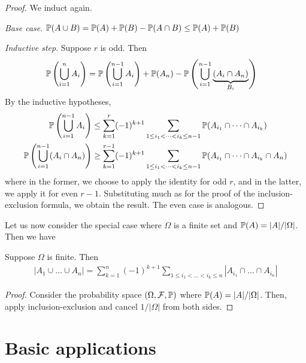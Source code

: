 \documentclass{../template/note}
\begin{document}
    \begin{proof}
        We induct again.

        \emph{Base case}. \(\mathbb P(A \cup B) = \mathbb P(A) + \mathbb P(B) - \mathbb P(A \cap B) \leq \mathbb P(A) + \mathbb P(B)\)

        \emph{Inductive step}. Suppose \(r\) is odd. Then
        \begin{align*}
            \mathbb P\left(\bigcup_{i=1}^n A_i\right) &= \mathbb P\left(\bigcup_{i=1}^{n-1} A_i\right) + \mathbb P(A_n) - \mathbb P\left(\bigcup_{i=1}^{n-1} \underbrace{\left(A_i \cap A_n\right)}_{B_i}\right)
        \end{align*}
        By the inductive hypotheses,
        \begin{align*}
            \mathbb P\left(\bigcup_{i=1}^{n-1} A_i\right) &\leq \sum_{k=1}^{r} (-1)^{k+1} \sum_{1 \leq i_1 < \dots < i_k \leq n-1} \mathbb P(A_{i_1} \cap \dots \cap A_{i_k}) \\
            \mathbb P\left(\bigcup_{i=1}^{n-1} (A_i \cap A_n)\right) &\geq \sum_{k=1}^{r-1} (-1)^{k+1} \sum_{1 \leq i_1 < \dots < i_k \leq n-1} \mathbb P(A_{i_1} \cap \dots \cap A_{i_k} \cap A_n)
        \end{align*}
        where in the former, we choose to apply the identity for odd \(r\), and in the latter, we apply it for even \(r-1\). Substituting much as for the proof of the inclusion-exclusion formula, we obtain the result. The even case is analogous.
    \end{proof}
    
    Let us now consider the special case where \(\Omega\) is a finite set and \(\mathbb P(A) = | A| /| \Omega| \). Then we have

    \begin{corollary}
        Suppose \(\Omega\) is finite. Then
        \begin{align*}
            | A_1 \cup \dots \cup A_n|  = \sum_{k=1}^n (-1)^{k+1} \sum_{1 \leq i_1 < \dots < i_k \leq n} | A_{i_1} \cap \dots \cap A_{i_n}| 
        \end{align*}
    \end{corollary}
    
    \begin{proof}
        Consider the probability space \((\Omega, \mathcal F, \mathbb P)\) where \(\mathbb P(A) = | A| /| \Omega| \). Then, apply inclusion-exclusion and cancel \(1/| \Omega| \) from both sides.
    \end{proof}
    
    \section{Basic applications}
\end{document}
